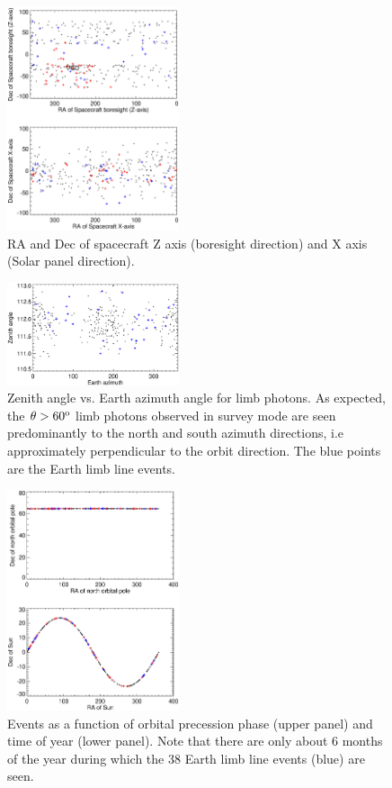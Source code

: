 \documentclass[aps,twocolumn,prd,superscriptaddress,showpacs,nofootinbib,fixfloat]{revtex4}
\newcommand{\degree}{^{\rm o}}
\begin{document}
\begin{figure}
  \centering
  \includegraphics[width=0.45\textwidth]{plots/spacecraft-zx.ps}
  \caption{RA and Dec of spacecraft Z axis (boresight
  direction) and X axis (Solar panel direction).  }
  \label{fig:spacecraft-zx}
\end{figure}

\begin{figure}
  \centering
  \includegraphics[width=0.45\textwidth]{plots/earth-az.ps}
  \caption{Zenith angle vs. Earth azimuth angle for limb
  photons.  As expected, the $\theta > 60\degree$ limb
  photons observed in survey mode are seen predominantly to
  the north and south azimuth directions, i.e approximately
  perpendicular to the orbit direction. The blue points are
  the Earth limb line events. }
  \label{fig:earth-az}
\end{figure}

\begin{figure}
  \centering
  \includegraphics[width=0.45\textwidth]{plots/sun.ps}
  \caption{Events as a function of
  orbital precession phase (upper panel) and time of year
  (lower panel).  Note that there are only about 6 months of
  the year during which the 38 Earth limb line events (blue) are seen.}
  \label{fig:sun}
\end{figure}
\end{document}

